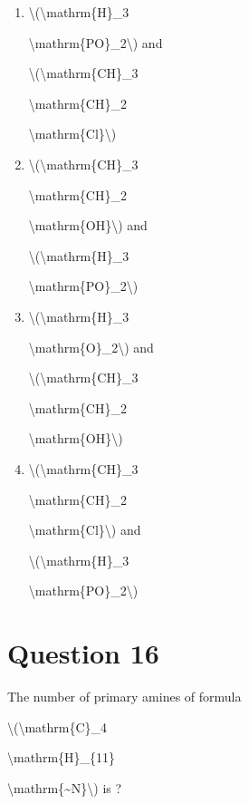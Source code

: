 \documentclass{article}
\begin{document}
\begin{enumerate}[label=(\alph*)]
\item \textbackslash(\textbackslash mathrm\{H\}\_3

\textbackslash mathrm\{PO\}\_2\textbackslash) and

\textbackslash(\textbackslash mathrm\{CH\}\_3

\textbackslash mathrm\{CH\}\_2

\textbackslash mathrm\{Cl\}\textbackslash)


\item \textbackslash(\textbackslash mathrm\{CH\}\_3

\textbackslash mathrm\{CH\}\_2

\textbackslash mathrm\{OH\}\textbackslash) and

\textbackslash(\textbackslash mathrm\{H\}\_3

\textbackslash mathrm\{PO\}\_2\textbackslash)


\item \textbackslash(\textbackslash mathrm\{H\}\_3

\textbackslash mathrm\{O\}\_2\textbackslash) and

\textbackslash(\textbackslash mathrm\{CH\}\_3

\textbackslash mathrm\{CH\}\_2

\textbackslash mathrm\{OH\}\textbackslash)


\item \textbackslash(\textbackslash mathrm\{CH\}\_3

\textbackslash mathrm\{CH\}\_2

\textbackslash mathrm\{Cl\}\textbackslash) and

\textbackslash(\textbackslash mathrm\{H\}\_3

\textbackslash mathrm\{PO\}\_2\textbackslash)


\end{enumerate}
\newpage
\section*{Question 16}
The number of primary amines of formula

\textbackslash(\textbackslash mathrm\{C\}\_4

\textbackslash mathrm\{H\}\_\{11\}

\textbackslash mathrm\{\textasciitilde N\}\textbackslash) is ?


\begin{enumerate}[label=(\alph*)]
\end{enumerate}
\newpage
\end{document}
